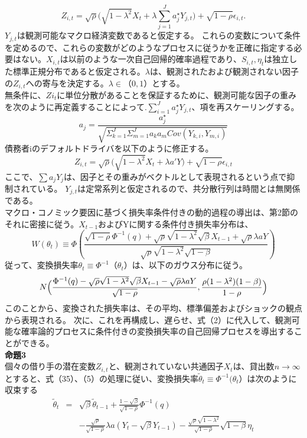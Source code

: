 \documentclass[a4j,12pt]{jarticle}
\begin{document}
\begin{equation}
Z_{i,t}=\sqrt{\rho}\bigl(\sqrt{1-\lambda^2} X_t +
\lambda \sum_{j=1}^J a_j^{\star} Y_{j,t} \bigr)+\sqrt{1-\rho}\epsilon_{i,t}.
\end{equation}
$Y_{j,t}$は観測可能なマクロ経済変数であると仮定する。 これらの変数について条件を定めるので、これらの変数がどのようなプロセスに従うかを正確に指定する必要はない。$X_{i,t}$は以前のような一次自己回帰的確率過程であり、$S_{i,t},\eta_t$は独立した標準正規分布であると仮定される。$\lambda$は、観測されたおよび観測されない因子の$Z_{i,t}$への寄与を決定する。$\lambda\in（0,1）$とする。\\
無条件に、$Zi_t$に単位分散があることを保証するために、観測可能な因子の重みを次のように再定義することによって.$\sum_{i=1}^{J}a_j^{\star}Y_{j,t}$、項を再スケーリングする。
\begin{equation}
a_j = \frac{a_j^{\star}}{\sqrt{\Sigma_{k=1}^{J}\Sigma_{m=1}^{J} a_k a_m Cov(Y_{k,i},Y_{m,i})}}
\end{equation}
債務者iのデフォルトドライバを以下のように修正する。
\begin{equation}
Z_{i,t}=\sqrt{\rho}\bigr(\sqrt{1-\lambda^2}X_t + \lambda a'Y\bigl)+\sqrt{1-\rho}\epsilon_{i,t}
\end{equation}
ここで、$\sum a_j Y_j$は、因子とその重みがベクトルとして表現されるという点で抑制されている。 $Y_{j,t}$は定常系列と仮定されるので、共分散行列は時間とは無関係である。\\
マクロ・コノミック要因に基づく損失率条件付きの動的過程の導出は、第2節のそれに密接に従う。$X_{t-1}$およびYに関する条件付き損失率分布は、
\begin{equation}
W(\theta_t)\equiv\Phi(\frac{\sqrt{1-\rho}\Phi^{-1}(q)+\sqrt{\rho}\sqrt{1-\lambda^2}\sqrt{\beta}X_{t-1} + \sqrt{\rho}\lambda aY }{\sqrt{\rho}\sqrt{1-\lambda^2}\sqrt{1-\beta}})
\end{equation}
従って、変換損失率$\theta_t\equiv\Phi^{-1}（\theta_t）$は、以下のガウス分布に従う。
\begin{equation}
N\Bigl(\frac{\Phi^{-1}(q)-\sqrt{\rho}\sqrt{1-\lambda^2}\sqrt{\beta}X_{t-1}-\sqrt{\rho}\lambda aY}{\sqrt{1-\rho}},\frac{\rho(1-\lambda^2)(1-\beta)}{1-\rho} \Bigr)
\end{equation}
このことから、変換された損失率は、その平均、標準偏差およびショックの観点から表現される。 次に、これを再構成し、遅らせ、式（2）に代入して、観測可能な確率論的プロセスに条件付きの変換損失率の自己回帰プロセスを導出することができる。\\
{\bf 命題3}\\
個々の借り手の潜在変数$Z_{i,t}$と、観測されていない共通因子$X_t$は、貸出数$n\rightarrow\infty$とすると、式（35）、（5）の処理に従い、変換損失率$\tilde{\theta}_t\equiv\Phi^{-1}(\theta_t）$は次のように収束する
\begin{eqnarray}
\tilde{\theta}_t&=&\sqrt{\beta}\tilde{\theta}_{t-1}+\frac{1-\sqrt{\beta}}{\sqrt{1-\rho}}\Phi^{-1}(q)\\
&&-\frac{\sqrt{\rho}}{\sqrt{1-\rho}}\lambda a(Y_t-\sqrt{\beta}Y_{t-1})-\frac{\sqrt{\rho}\sqrt{1-\lambda^2}}{\sqrt{1-\rho}}\sqrt{1-\beta}\eta_t
\end{eqnarray}
\end{document}
